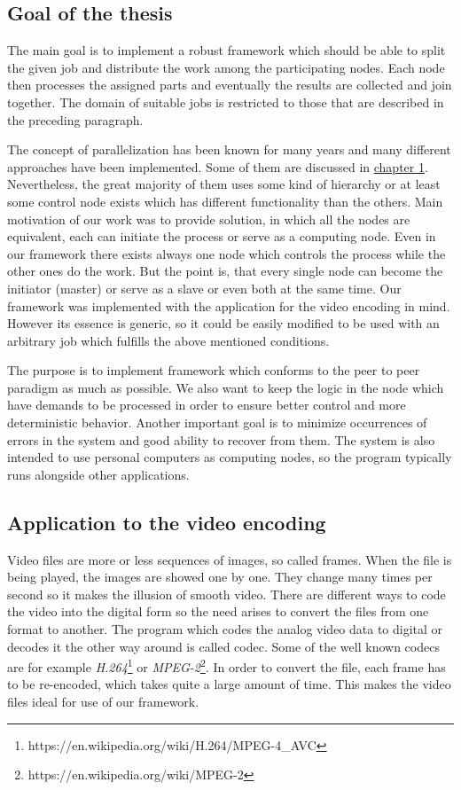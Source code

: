 \subsection*{Goal of the thesis} %
The main goal is to implement a robust framework which should be able to split the given job and  distribute the work among the participating nodes. Each node then processes the assigned parts and eventually the results are collected and join together. The domain of suitable jobs is restricted to those that are described in the preceding paragraph.

The concept of parallelization has been known for many years and many different approaches have been implemented. Some of them are discussed in \hyperref[existing-solutions]{chapter 1}. Nevertheless, the great majority of them uses some kind of hierarchy or at least some control node exists which has different functionality than the others. Main motivation of our work was to provide solution, in which all the nodes are equivalent, each can initiate the process or serve as a computing node. Even in our framework there exists always one node which controls the process while the other ones do the work. But the point is, that every single node can become the initiator (master) or serve as a slave or even both at the same time. Our framework was implemented with the application for the video encoding in mind. However its essence is generic, so it could be easily modified to be used with an arbitrary job which fulfills the above mentioned conditions.

The purpose is to implement framework which conforms to the peer to peer paradigm as much as possible. We also want to keep the logic in the node which have demands to be processed in order to ensure better control and more deterministic behavior. Another important goal is to minimize occurrences of errors in the system and good ability to recover from them. The system is also intended to use personal computers as computing nodes, so the program typically runs alongside other applications.


\subsection*{Application to the video encoding}
Video files are more or less sequences of images, so called frames. When the file is being played, the images are showed one by one. They change many times per second so it makes the illusion of smooth video. There are different ways to code the video into the digital form so the need arises to convert the files from one format to another. The program which codes the analog video data to digital or decodes it the other way around is called codec. Some of the well known codecs are for example \textit{H.264}\footnote{https://en.wikipedia.org/wiki/H.264/MPEG-4\_AVC} or \textit{MPEG-2}\footnote{https://en.wikipedia.org/wiki/MPEG-2}. In order to convert the file, each frame has to be re-encoded, which takes quite a large amount of time. This makes the video files ideal for use of our framework.


